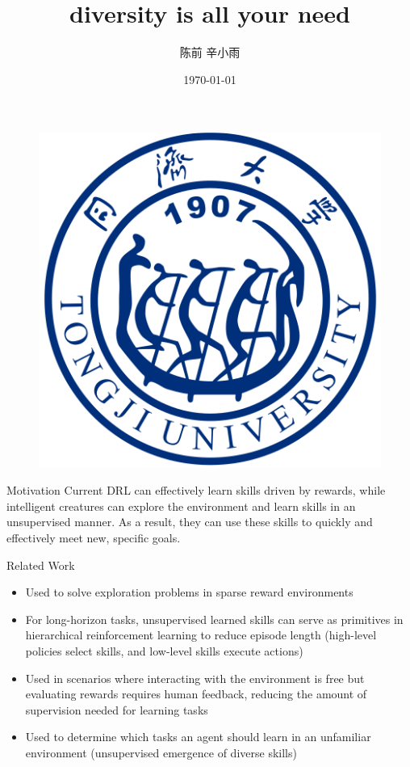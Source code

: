 \documentclass{beamer}
\author[Author]{陈前 辛小雨}
\title{diversity is all your need}
\institute{tju}
\date{\today}
\begin{document}
\begin{frame}
    \titlepage
    \begin{figure}[htpb]
       \begin{center}
            \includegraphics[width=0.2\linewidth]{pic/tongji_logo.png}
        \end{center}
    \end{figure}
\end{frame}

\begin{frame}{Motivation}
    Current DRL can effectively learn skills driven by rewards, while intelligent creatures can explore the environment and learn skills in an unsupervised manner. As a result, they can use these skills to quickly and effectively meet new, specific goals.
\end{frame}

\begin{frame}{Related Work}
	\footnotesize
	\begin{itemize}
		\item Used to solve exploration problems in sparse reward environments
		\vspace{0.2cm}
		\item For long-horizon tasks, unsupervised learned skills can serve as primitives in hierarchical reinforcement learning to reduce episode length (high-level policies select skills, and low-level skills execute actions)
		\vspace{0.2cm}
		\item Used in scenarios where interacting with the environment is free but evaluating rewards requires human feedback, reducing the amount of supervision needed for learning tasks\vspace{0.2cm}
		\item Used to determine which tasks an agent should learn in an unfamiliar environment (unsupervised emergence of diverse skills)
	\end{itemize}
\end{frame}
\end{document}
